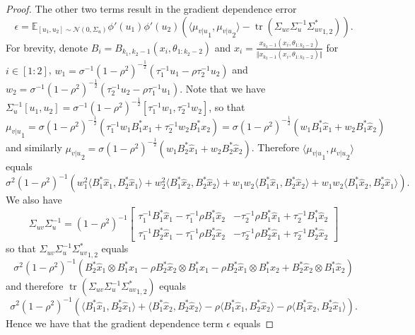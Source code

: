 \documentclass[twoside,11pt]{article}
\newcommand{\E}{\mathbb{E}}
\DeclareMathOperator{\tr}{tr}
\begin{document}
\begin{proof}
The other two terms result in the gradient dependence error
\[
\epsilon = \E_{[u_1,u_2] \sim \mathcal{N}( 0,\Sigma_u)} \phi'(u_1)\phi'(u_2) \left( \langle {\mu_{v \vert u}}_1, {\mu_{v \vert u}}_2 \rangle - \tr({\Sigma_{uv} \Sigma_u^{-1} \Sigma_{uv}^*}_{1,2})\right).
\]
For brevity, denote $B_i = B_{k_1,k_2-1}(x_i,\theta_{1:k_2-2})$ and $\hat{x}_i = \frac{x_{k_2-1}(x_i, \theta_{1 : k_2-2})}{\Vert x_{k_2-1}(x_i, \theta_{1 : k_2-2}) \Vert}$ for $i \in [1:2]$, $w_1 = \sigma^{-1} (1-\rho^2)^{-\frac{1}{2}} (\tau_1^{-1} u_1 - \rho \tau_2^{-1} u_2)$ and $w_2 = \sigma^{-1} (1-\rho^2)^{-\frac{1}{2}} (\tau_2^{-1} u_2 - \rho \tau_1^{-1} u_1)$. Note that we have $\Sigma_u^{-1} [u_1,u_2] = \sigma^{-1} (1-\rho^2)^{-\frac{1}{2}} [\tau_1^{-1} w_1 , \tau_2^{-1} w_2]$, so that ${\mu_{v \vert u}}_1 = \sigma (1-\rho^2)^{-\frac{1}{2}} (\tau_1^{-1} w_1 B_1^* x_1 + \tau_2^{-1} w_2 B_1^* x_2) = \sigma (1-\rho^2)^{-\frac{1}{2}} (w_1 B_1^* \hat{x}_1 + w_2 B_1^* \hat{x}_2)$ and similarly ${\mu_{v \vert u}}_2 
= \sigma (1-\rho^2)^{-\frac{1}{2}} (w_1 B_2^* \hat{x}_1 + w_2 B_2^* \hat{x}_2)$. Therefore $\langle {\mu_{v \vert u}}_1 , {\mu_{v \vert u}}_2 \rangle$ equals
\[
\sigma^2 (1-\rho^2)^{-1} \left( w_1^2 \langle B_1^* \hat{x}_1, B_2^* \hat{x}_1 \rangle
+ w_2^2 \langle B_1^* \hat{x}_2, B_2^* \hat{x}_2 \rangle
+ w_1 w_2 \langle B_1^* \hat{x}_1, B_2^* \hat{x}_2 \rangle
+ w_1 w_2 \langle B_1^* \hat{x}_2, B_2^* \hat{x}_1 \rangle \right).
\]
We also have
\[
\Sigma_{uv} \Sigma_u^{-1}
= (1-\rho^2)^{-1} \left[ \begin{smallmatrix} 
 \tau_1^{-1} B_1^* \hat{x}_1 - \tau_1^{-1} \rho B_1^* \hat{x}_2 & 
 -\tau_2^{-1} \rho B_1^* \hat{x}_1 + \tau_2^{-1} B_1^* \hat{x}_2 \\ 
 \tau_1^{-1} B_2^* \hat{x}_1 - \tau_1^{-1} \rho B_2^* \hat{x}_2 & 
 -\tau_2^{-1} \rho B_2^* \hat{x}_1 + \tau_2^{-1} B_2^* \hat{x}_2
\end{smallmatrix} \right]
\]
so that ${\Sigma_{uv} \Sigma_u^{-1} \Sigma_{uv}^*}_{1,2}$ equals
\[
\sigma^2 (1-\rho^2)^{-1} \left( 
B_2^* \hat{x}_1 \otimes B_1^* \hat{x}_1
- \rho B_2^* \hat{x}_2 \otimes B_1^* \hat{x}_1
- \rho B_2^* \hat{x}_1 \otimes B_1^* \hat{x}_2
+ B_2^* \hat{x}_2 \otimes B_1^* \hat{x}_2
\right)
\]
and therefore $\tr({\Sigma_{uv} \Sigma_u^{-1} \Sigma_{uv}^*}_{1,2})$ equals
\[
\sigma^2 (1-\rho^2)^{-1} \left( 
\langle B_1^* \hat{x}_1, B_2^* \hat{x}_1 \rangle
+ \langle B_1^* \hat{x}_2, B_2^* \hat{x}_2 \rangle
- \rho \langle B_1^* \hat{x}_1, B_2^* \hat{x}_2 \rangle
- \rho \langle B_1^* \hat{x}_2, B_2^* \hat{x}_1 \rangle
\right).
\]
Hence we have that the gradient dependence term $\epsilon$ equals

\end{proof}
\end{document}
